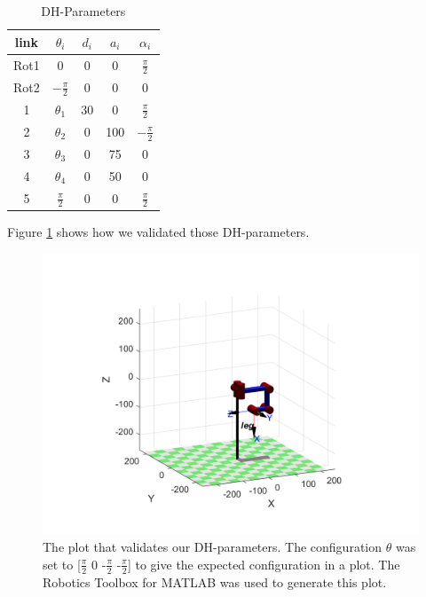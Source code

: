 \begin{table}
\caption{DH-Parameters}
\label{tab:dhparams}
\begin{center}
\begin{tabular}{ | c | c | c | c | c |} 
\hline
link & $\theta_i$ & $d_i$ & $a_i$ & $\alpha_i$ \\
\hline
Rot1 & 0 & 0 & 0 & $\frac{\pi}{2}$ \\
\hline
Rot2 & $-\frac{\pi}{2}$ & 0 & 0 & 0 \\
\hline
1    & $\theta_1$ & 30  & 0  & $\frac{\pi}{2}$  \\
\hline
2    & $\theta_2$  & 0  & 100 & $-\frac{\pi}{2}$  \\
\hline
3    & $\theta_3$  & 0  & 75  & 0 \\
\hline
4    & $\theta_4$  & 0  & 50  & 0 \\
\hline
5    & $\frac{\pi}{2}$  & 0  & 0  &  $\frac{\pi}{2}$ \\
\hline
\end{tabular}
\end{center}
\end{table}

Figure \ref{fig:dhvalidation} shows how we validated those DH-parameters.

\begin{figure}[thpb]
    \parbox{\linewidth}{\includegraphics[width=\linewidth]{Figures/dhvalidation.png}}
    \caption{The plot that validates our DH-parameters. The configuration $\theta$ was set to [$\frac{\pi}{2}$ 0 -$\frac{\pi}{2}$ -$\frac{\pi}{2}$] to give the expected configuration in a plot. The Robotics Toolbox for MATLAB was used to generate this plot.}
    \label{fig:dhvalidation}
\end{figure}

